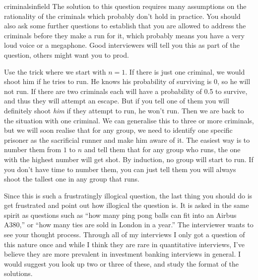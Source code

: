 \begin{answer}{criminalsinfield}
  The solution to this question requires many assumptions on the rationality of the criminals which probably don't hold in practice.
  You should also ask some further questions to establish that you are allowed to address the criminals before they make a run for it, which probably means you have a very loud voice or a megaphone.
  Good interviewers will tell you this as part of the question, others might want you to prod.

  Use the trick where we start with $n=1$.
  If there is just one criminal, we would shoot him if he tries to run.
  He knows his probability of surviving is 0, so he will not run.
  If there are two criminals each will have a probability of 0.5 to survive, and thus they will attempt an escape.
  But if you tell one of them you will definitely shoot \emph{him} if they attempt to run, he won't run.
  Then we are back to the situation with one criminal.
  We can generalise this to three or more criminals, but we will soon realise that for any group, we need to identify one specific prisoner as the sacrificial runner and make him aware of it.
  The easiest way is to number them from $1$ to $n$ and tell them that for any group who runs, the one with the highest number will get shot.
  By induction, no group will start to run.
  If you don't have time to number them, you can just tell them you will always shoot the tallest one in any group that runs.

  Since this is such a frustratingly illogical question, the last thing you should do is get frustrated and point out how illogical the question is.
  It is asked in the same spirit as questions such as ``how many ping pong balls can fit into an Airbus A380,'' or ``how many ties are sold in London in a year.''
  The interviewer wants to see your thought process.
  Through all of my interviews I only got a question of this nature once and while I think they are rare in quantitative interviews, I've believe they are more prevalent in investment banking interviews in general.
  I would suggest you look up two or three of these, and study the format of the solutions.
\end{answer}
